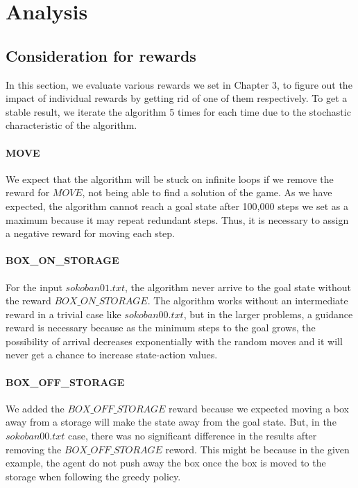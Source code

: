 \documentclass{article}
\begin{document}
\section{Analysis}
\subsection{Consideration for rewards}
In this section, we evaluate various rewards we set in Chapter 3, to figure out the impact of individual rewards by getting rid of one of them respectively. To get a stable result, we iterate the algorithm 5 times for each time due to the stochastic characteristic of the algorithm.

\paragraph{MOVE}
We expect that the algorithm will be stuck on infinite loops if we remove the reward for $MOVE$, not being able to find a solution of the game. As we have expected, the algorithm cannot reach a goal state after 100,000 steps we set as a maximum because it may repeat redundant steps. Thus, it is necessary to assign a negative reward for moving each step.

\paragraph{BOX\_ON\_STORAGE}
For the input $sokoban01.txt$, the algorithm never arrive to the goal state without the reward $BOX\_ON\_STORAGE$. The algorithm works without an intermediate reward in a trivial case like $sokoban00.txt$, but in the larger problems, a guidance reward is necessary because as the minimum steps to the goal grows, the possibility of arrival decreases exponentially with the random moves and it will never get a chance to increase state-action values.

\paragraph{BOX\_OFF\_STORAGE}
We added the $BOX\_OFF\_STORAGE$ reward because we expected moving a box away from a storage will make the state away from the goal state. But, in the $sokoban00.txt$ case, there was no significant difference in the results after removing the $BOX\_OFF\_STORAGE$ reword. This might be because in the given example, the agent do not push away the box once the box is moved to the storage when following the greedy policy.
\end{document}
